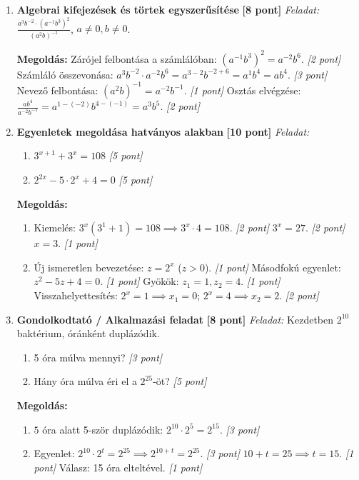 \documentclass[a4paper,11pt]{article}
\begin{document}
\begin{enumerate}
  \item \textbf{Algebrai kifejezések és törtek egyszerűsítése} \hfill \textbf{[8 pont]}
  \textit{Feladat:} $\frac{a^3 b^{-2} \cdot (a^{-1} b^3)^2}{(a^2 b)^{-1}}$, $a \neq 0, b \neq 0$.
  
  \textbf{Megoldás:}
  Zárójel felbontása a számlálóban: $(a^{-1} b^3)^2 = a^{-2} b^6$. \hfill \textit{[2 pont]}
  Számláló összevonása: $a^3 b^{-2} \cdot a^{-2} b^6 = a^{3-2} b^{-2+6} = a^1 b^4 = ab^4$. \hfill \textit{[3 pont]}
  Nevező felbontása: $(a^2 b)^{-1} = a^{-2} b^{-1}$. \hfill \textit{[1 pont]}
  Osztás elvégzése: $\frac{ab^4}{a^{-2} b^{-1}} = a^{1-(-2)} b^{4-(-1)} = a^3 b^5$. \hfill \textit{[2 pont]}

  \item \textbf{Egyenletek megoldása hatványos alakban} \hfill \textbf{[10 pont]}
  \textit{Feladat:} 
  \begin{enumerate}
    \item $3^{x+1} + 3^x = 108$ \hfill \textit{[5 pont]}
    \item $2^{2x} - 5 \cdot 2^x + 4 = 0$ \hfill \textit{[5 pont]}
  \end{enumerate}

  \textbf{Megoldás:}
  \begin{enumerate}
    \item Kiemelés: $3^x(3^1 + 1) = 108 \implies 3^x \cdot 4 = 108$. \hfill \textit{[2 pont]}
    $3^x = 27$. \hfill \textit{[2 pont]}
    $x = 3$. \hfill \textit{[1 pont]}
    \item Új ismeretlen bevezetése: $z = 2^x$ ($z > 0$). \hfill \textit{[1 pont]}
    Másodfokú egyenlet: $z^2 - 5z + 4 = 0$. \hfill \textit{[1 pont]}
    Gyökök: $z_1 = 1, z_2 = 4$. \hfill \textit{[1 pont]}
    Visszahelyettesítés: $2^x = 1 \implies x_1 = 0$; $2^x = 4 \implies x_2 = 2$. \hfill \textit{[2 pont]}
  \end{enumerate}

  \item \textbf{Gondolkodtató / Alkalmazási feladat} \hfill \textbf{[8 pont]}
  \textit{Feladat:} Kezdetben $2^{10}$ baktérium, óránként duplázódik.
  \begin{enumerate}
    \item 5 óra múlva mennyi? \hfill \textit{[3 pont]}
    \item Hány óra múlva éri el a $2^{25}$-öt? \hfill \textit{[5 pont]}
  \end{enumerate}

  \textbf{Megoldás:}
  \begin{enumerate}
    \item $5$ óra alatt 5-ször duplázódik: $2^{10} \cdot 2^5 = 2^{15}$. \hfill \textit{[3 pont]}
    \item Egyenlet: $2^{10} \cdot 2^t = 2^{25} \implies 2^{10+t} = 2^{25}$. \hfill \textit{[3 pont]}
    $10 + t = 25 \implies t = 15$. \hfill \textit{[1 pont]}
    Válasz: 15 óra elteltével. \hfill \textit{[1 pont]}
  \end{enumerate}
\end{enumerate}
\end{document}
